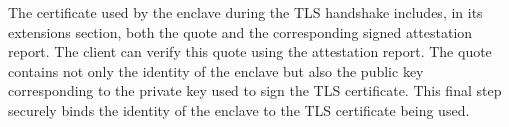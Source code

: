 The certificate used by the enclave during the TLS handshake includes, in its extensions section, both the quote and the corresponding signed attestation report. The client can verify this quote using the attestation report. The quote contains not only the identity of the enclave but also the public key corresponding to the private key used to sign the TLS certificate. This final step securely binds the identity of the enclave to the TLS certificate being used.


